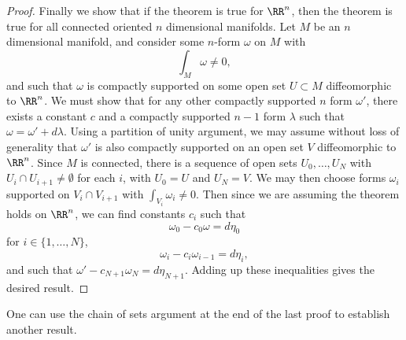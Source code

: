 \begin{proof}
    Finally we show that if the theorem is true for $\RR^n$, then the theorem is true for all connected oriented $n$ dimensional manifolds. Let $M$ be an $n$ dimensional manifold, and consider some $n$-form $\omega$ on $M$ with
    \[ \int_M \omega \neq 0, \]
    and such that $\omega$ is compactly supported on some open set $U \subset M$ diffeomorphic to $\RR^n$. We must show that for any other compactly supported $n$ form $\omega'$, there exists a constant $c$ and a compactly supported $n-1$ form $\lambda$ such that $\omega = \omega' + d\lambda$. Using a partition of unity argument, we may assume without loss of generality that $\omega'$ is also compactly supported on an open set $V$ diffeomorphic to $\RR^n$. Since $M$ is connected, there is a sequence of open sets $U_0, \dots, U_N$ with $U_i \cap U_{i+1} \neq \emptyset$ for each $i$, with $U_0 = U$ and $U_N = V$. We may then choose forms $\omega_i$ supported on $V_i \cap V_{i+1}$ with $\int_{V_i} \omega_i \neq 0$. Then since we are assuming the theorem holds on $\RR^n$, we can find constants $c_i$ such that
    \[ \omega_0 - c_0 \omega = d\eta_0 \]
    for $i \in \{ 1, \dots, N \}$,
    \[ \omega_i - c_i \omega_{i-1} = d\eta_i, \]
    and such that $\omega' - c_{N+1} \omega_N = d\eta_{N+1}$. Adding up these inequalities gives the desired result.
\end{proof}

One can use the chain of sets argument at the end of the last proof to establish another result.

